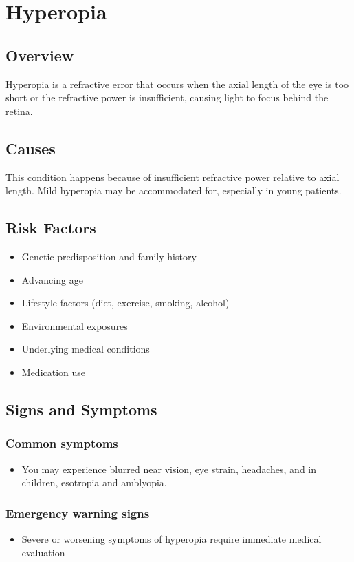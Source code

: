 \chapter{Hyperopia}
\label{sec:Hyperopia}

\section{Overview}
Hyperopia is a refractive error that occurs when the axial length of the eye is too short or the refractive power is insufficient, causing light to focus behind the retina.
\section{Causes}
This condition happens because of insufficient refractive power relative to axial length. Mild hyperopia may be accommodated for, especially in young patients.     
\section{Risk Factors}

\begin{itemize}[noitemsep]
  \item Genetic predisposition and family history
  \item Advancing age
  \item Lifestyle factors (diet, exercise, smoking, alcohol)
  \item Environmental exposures
  \item Underlying medical conditions
  \item Medication use
\end{itemize}
\section{Signs and Symptoms}

\subsection{Common symptoms}
\begin{itemize}[noitemsep]
  \item You may experience blurred near vision, eye strain, headaches, and in children, esotropia and amblyopia. 
  \end{itemize}

\subsection{Emergency warning signs}
\begin{itemize}[noitemsep]
  \item Severe or worsening symptoms of hyperopia require immediate medical evaluation
\end{itemize}
